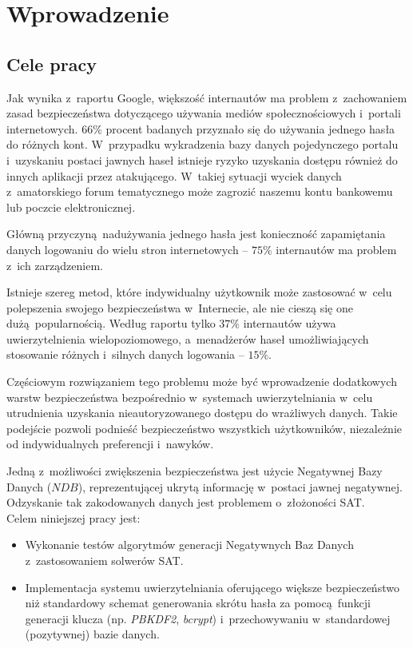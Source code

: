 \chapter{Wprowadzenie}
\label{chp:intro}
\section{Cele pracy}
Jak wynika z~raportu Google\cite{google-poll}, większość internautów ma problem z~zachowaniem zasad bezpieczeństwa dotyczącego 
używania mediów społecznościowych i~portali internetowych. $66\%$ procent badanych przyznało się do używania jednego hasła do różnych kont. 
W~przypadku wykradzenia bazy danych pojedynczego portalu i~uzyskaniu postaci jawnych haseł istnieje ryzyko uzyskania dostępu również do innych aplikacji
przez atakującego. W~takiej sytuacji wyciek danych z~amatorskiego forum tematycznego może zagrozić naszemu kontu bankowemu lub poczcie elektronicznej.

Główną przyczyną nadużywania jednego hasła jest konieczność zapamiętania danych logowaniu do wielu stron internetowych -- $75\%$ internautów ma problem z~ich zarządzeniem.
  
Istnieje szereg metod, które indywidualny użytkownik może zastosować w~celu polepszenia swojego bezpieczeństwa w~Internecie, ale nie cieszą
się one dużą popularnością. Według raportu tylko $37\%$ internautów używa uwierzytelnienia wielopoziomowego, a~menadżerów haseł
umożliwiających stosowanie różnych i~silnych danych logowania -- $15\%$.

Częściowym rozwiązaniem tego problemu może być wprowadzenie dodatkowych warstw bezpieczeństwa bezpośrednio w~systemach uwierzytelniania
w~celu utrudnienia uzyskania nieautoryzowanego dostępu do wrażliwych danych. Takie podejście pozwoli podnieść bezpieczeństwo wszystkich użytkowników,
niezależnie od indywidualnych preferencji i~nawyków.

Jedną z~możliwości zwiększenia bezpieczeństwa jest użycie Negatywnej Bazy Danych ($NDB$), reprezentującej ukrytą informację w~postaci jawnej negatywnej.
Odzyskanie tak zakodowanych danych jest problemem o~złożoności SAT.
\\
Celem niniejszej pracy jest:
\begin{itemize}
    \item Wykonanie testów algorytmów generacji Negatywnych Baz Danych z~zastosowaniem solwerów SAT.
    \item Implementacja systemu uwierzytelniania oferującego większe bezpieczeństwo
    niż standardowy schemat generowania skrótu hasła za pomocą funkcji generacji klucza (np. \textit{PBKDF2}, \textit{bcrypt})
    i~przechowywaniu w~standardowej (pozytywnej) bazie danych.
\end{itemize} 
 
